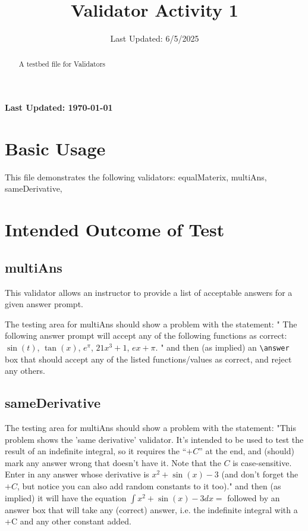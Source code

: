\documentclass{ximera}
\title{Validator Activity 1}
\date{Last Updated: 6/5/2025}
\begin{document}
\begin{abstract}
    A testbed file for Validators
\end{abstract}
\maketitle

{{\Huge \bfseries Last Updated: \today}} \\

\section{Basic Usage}

This file demonstrates the following validators: equalMaterix, multiAns, sameDerivative, 

\section{Intended Outcome of Test}

    \subsection*{multiAns}
        This validator allows an instructor to provide a list of acceptable answers for a given answer prompt.

        The testing area for multiAns should show a problem with the statement: 
        " The following answer prompt will accept any of the following functions as correct: $\sin(t)$, $\tan(x)$, $e^\pi$, $21x^3 + 1$, $ex + \pi$. "
        and then (as implied) an \verb|\answer| box that should accept any of the listed functions/values as correct, and reject any others.

    \subsection*{sameDerivative}
        The testing area for multiAns should show a problem with the statement: 
        "This problem shows the 'same derivative' validator. It's intended to be used to test the result of an indefinite integral, so it requires the ``$+C$'' at the end, and (should) mark any answer wrong that doesn't have it. Note that the $C$ is case-sensitive. \\
            
            Enter in any answer whose derivative is $x^2 + \sin(x) - 3$ (and don't forget the $+C$, but notice you can also add random constants to it too)."
        and then (as implied) it will have the equation $\int x^2 + \sin(x) - 3 dx =$ followed by an answer box that will take any (correct) answer, i.e. the 
        indefinite integral with a +C and any other constant added.
\end{document}
